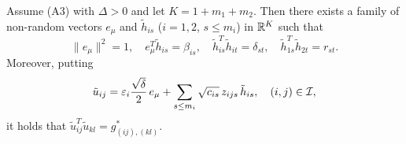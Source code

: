 \begin{lemma}
\label{lem:6}
Assume \textup{(A3)} with $\Delta>0$ and let $K=1+m_1+m_2$. Then there exists a
family of non-random vectors $e_\mu$ and $\tilde h_{is}$ ($i=1,2$, $s\le m_i$) in
$\mathbb{R}^K$ such that
\begin{equation}
\|e_\mu\|^2=1,\quad
e_\mu^T\tilde h_{is}=\beta_{is},\quad
\tilde h_{is}^T\tilde h_{it}=\delta_{st},\quad
\tilde h_{1s}^T\tilde h_{2t}=r_{st}.
\label{eq:4.4}
\end{equation}
Moreover, putting
\begin{equation}
\tilde u_{ij}
=\varepsilon_i\frac{\sqrt{\delta}}{2}\,e_\mu
+\sum_{s\le m_i}\sqrt{c_{is}}\,z_{ijs}\,\tilde h_{is},
\quad(i,j)\in\mathcal{I},
\label{eq:4.5}
\end{equation}
it holds that $\tilde u_{ij}^T\tilde u_{kl}=g^*_{(ij),(kl)}$.
\end{lemma}

